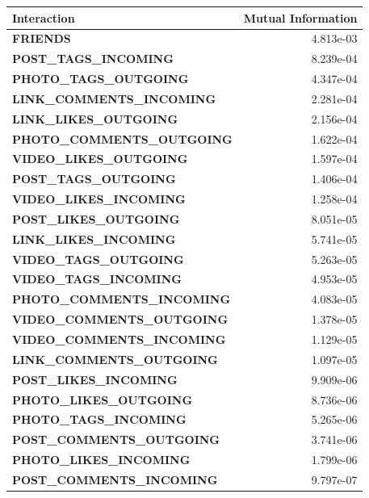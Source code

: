 \begin{table}
	\centering
	\begin{tabular}{| >{\small}l | >{\small}r |}
	\hline
	\textbf{Interaction} & \textbf{Mutual Information} \\
	\hline
	\textbf{FRIENDS} & 4.813e-03\\
	\hline
	\textbf{POST\_TAGS\_INCOMING} &8.239e-04\\
	\hline
	\textbf{PHOTO\_TAGS\_OUTGOING} & 4.347e-04\\
	\hline
	\textbf{LINK\_COMMENTS\_INCOMING} & 2.281e-04\\
	\hline
	\textbf{LINK\_LIKES\_OUTGOING} & 2.156e-04\\
	\hline
	\textbf{PHOTO\_COMMENTS\_OUTGOING} & 1.622e-04\\
	\hline
	\textbf{VIDEO\_LIKES\_OUTGOING} & 1.597e-04\\
	\hline
	\textbf{POST\_TAGS\_OUTGOING} & 1.406e-04\\
	\hline
	\textbf{VIDEO\_LIKES\_INCOMING} & 1.258e-04\\
	\hline
	\textbf{POST\_LIKES\_OUTGOING} & 8.051e-05\\
	\hline
	\textbf{LINK\_LIKES\_INCOMING} & 5.741e-05\\
	\hline
	\textbf{VIDEO\_TAGS\_OUTGOING} & 5.263e-05\\
	\hline
	\textbf{VIDEO\_TAGS\_INCOMING} & 4.953e-05\\
	\hline
	\textbf{PHOTO\_COMMENTS\_INCOMING} & 4.083e-05\\
	\hline
	\textbf{VIDEO\_COMMENTS\_OUTGOING} & 1.378e-05\\
	\hline
	\textbf{VIDEO\_COMMENTS\_INCOMING} & 1.129e-05\\
	\hline
	\textbf{LINK\_COMMENTS\_OUTGOING} & 1.097e-05\\
	\hline
	\textbf{POST\_LIKES\_INCOMING} & 9.909e-06\\
	\hline
	\textbf{PHOTO\_LIKES\_OUTGOING} & 8.736e-06\\
	\hline
	\textbf{PHOTO\_TAGS\_INCOMING} & 5.265e-06\\
	\hline
	\textbf{POST\_COMMENTS\_OUTGOING} & 3.741e-06\\
	\hline
	\textbf{PHOTO\_LIKES\_INCOMING} & 1.799e-06\\
	\hline
	\textbf{POST\_COMMENTS\_INCOMING} & 9.797e-07\\
	\hline
	\end{tabular}
	\npnoround
\end{table}

	